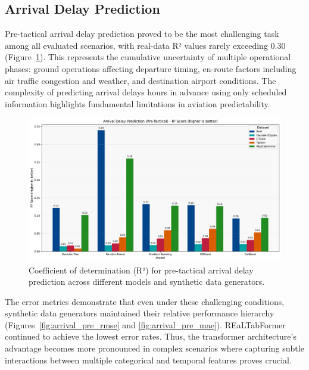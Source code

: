 \documentclass[conference]{IEEEtran}
\begin{document}
\subsection{Arrival Delay Prediction}

Pre-tactical arrival delay prediction proved to be the most challenging task among all evaluated scenarios, with real-data R² values rarely exceeding 0.30 (Figure~\ref{fig:arrival_pre_r2}). This represents the cumulative uncertainty of multiple operational phases: ground operations affecting departure timing, en-route factors including air traffic congestion and weather, and destination airport conditions. The complexity of predicting arrival delays hours in advance using only scheduled information highlights fundamental limitations in aviation predictability.

\begin{figure}[htbp]
    \centering
    \includegraphics[width=\linewidth]{plots/arrival_delay_min_pre-tactical/arrival_delay_min_pre-tactical_r2.pdf}
    \caption{Coefficient of determination (R²) for pre-tactical arrival delay prediction across different models and synthetic data generators.}
    \label{fig:arrival_pre_r2}
\end{figure}

The error metrics demonstrate that even under these challenging conditions, synthetic data generators maintained their relative performance hierarchy (Figures~\ref{fig:arrival_pre_rmse} and \ref{fig:arrival_pre_mae}). REaLTabFormer continued to achieve the lowest error rates. Thus, the transformer architecture's advantage becomes more pronounced in complex scenarios where capturing subtle interactions between multiple categorical and temporal features proves crucial.
\end{document}
